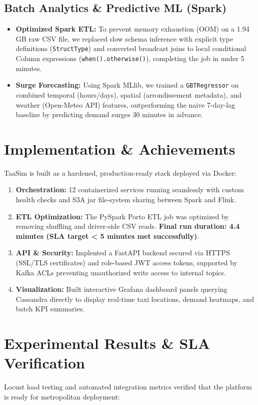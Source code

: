 \documentclass[11pt,a4paper]{article}
\begin{document}
\subsection{Batch Analytics \& Predictive ML (Spark)}
\begin{itemize}
    \item \textbf{Optimized Spark ETL:} To prevent memory exhaustion (OOM) on a 1.94 GB raw CSV file, we replaced slow schema inference with explicit type definitions (\texttt{StructType}) and converted broadcast joins to local conditional Column expressions (\texttt{when().otherwise()}), completing the job in under 5 minutes.
    \item \textbf{Surge Forecasting:} Using Spark MLlib, we trained a \texttt{GBTRegressor} on combined temporal (hours/days), spatial (arrondissement metadata), and weather (Open-Meteo API) features, outperforming the naive 7-day-lag baseline by predicting demand surges 30 minutes in advance.
\end{itemize}

\section{Implementation \& Achievements}
TaaSim is built as a hardened, production-ready stack deployed via Docker:
\begin{enumerate}
    \item \textbf{Orchestration:} 12 containerized services running seamlessly with custom health checks and S3A jar file-system sharing between Spark and Flink.
    \item \textbf{ETL Optimization:} The PySpark Porto ETL job was optimized by removing shuffling and driver-side CSV reads. \textbf{Final run duration: 4.4 minutes (SLA target < 5 minutes met successfully)}.
    \item \textbf{API \& Security:} Implented a FastAPI backend secured via HTTPS (SSL/TLS certificates) and role-based JWT access tokens, supported by Kafka ACLs preventing unauthorized write access to internal topics.
    \item \textbf{Visualization:} Built interactive Grafana dashboard panels querying Cassandra directly to display real-time taxi locations, demand heatmaps, and batch KPI summaries.
\end{enumerate}

\section{Experimental Results \& SLA Verification}
Locust load testing and automated integration metrics verified that the platform is ready for metropolitan deployment:
\end{document}
